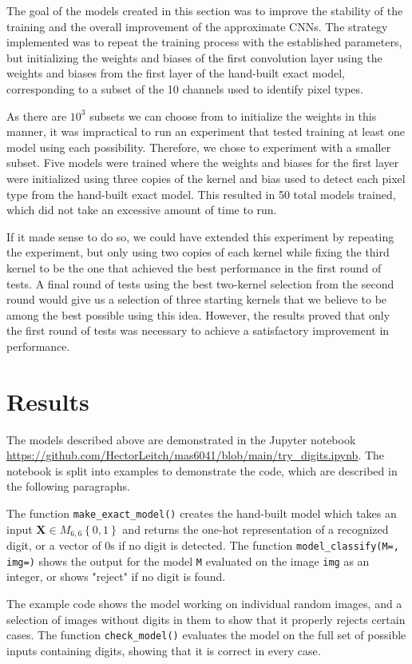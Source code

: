 \documentclass{somasmsc}
\begin{document}
The goal of the models created in this section was to improve the stability of the training and the overall improvement of the approximate CNNs. The strategy implemented was to repeat the training process with the established parameters, but initializing the weights and biases of the first convolution layer using the weights and biases from the first layer of the hand-built exact model, corresponding to a subset of the 10 channels used to identify pixel types.

As there are $10^3$ subsets we can choose from to initialize the weights in this manner, it was impractical to run an experiment that tested training at least one model using each possibility. Therefore, we chose to experiment with a smaller subset. Five models were trained where the weights and biases for the first layer were initialized using three copies of the kernel and bias used to detect each pixel type from the hand-built exact model. This resulted in 50 total models trained, which did not take an excessive amount of time to run.

If it made sense to do so, we could have extended this experiment by repeating the experiment, but only using two copies of each kernel while fixing the third kernel to be the one that achieved the best performance in the first round of tests. A final round of tests using the best two-kernel selection from the second round would give us a selection of three starting kernels that we believe to be among the best possible using this idea. However, the results proved that only the first round of tests was necessary to achieve a satisfactory improvement in performance.

\section{Results}

The models described above are demonstrated in the Jupyter notebook \url{https://github.com/HectorLeitch/mas6041/blob/main/try_digits.ipynb}. The notebook is split into examples to demonstrate the code, which are described in the following paragraphs.

\begin{exa}
The function \verb|make_exact_model()| creates the hand-built model which takes an input $\mathbf{X} \in M_{6,6}\left\{0,1\right\}$ and returns the one-hot representation of a recognized digit, or a vector of 0s if no digit is detected. The function \verb|model_classify(M=, img=)| shows the output for the model \verb|M| evaluated on the image \verb|img| as an integer, or shows "reject" if no digit is found.

The example code shows the model working on individual random images, and a selection of images without digits in them to show that it properly rejects certain cases. The function \verb|check_model()| evaluates the model on the full set of possible inputs containing digits, showing that it is correct in every case.
\end{exa}
\end{document}
